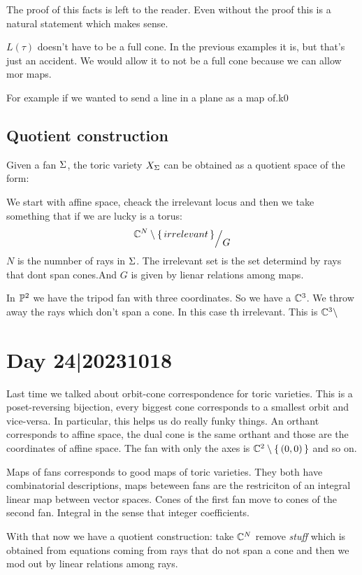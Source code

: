 \documentclass[12pt]{memoir}
\begin{document}
The proof of this facts is left to the reader. Even without the proof this is a natural statement which makes sense.
\begin{significant}
    $L(\tau)$ doesn't have to be a full cone. In the previous examples it is, but that's just an accident. We would allow it to not be a full cone because we can allow mor maps.
\end{significant}
For example if we wanted to send a line in a plane as a map of.k0

\subsection{Quotient construction}

Given a fan $\Sigma$, the toric variety $X_\Sigma$ can be obtained as a quotient space of the form:\par 
We start with affine space, cheack the irrelevant locus and then we take something that if we are lucky is a torus:
$$\quot{\bC^N\less\set{irrelevant}}{G}$$
$N$ is the numnber of rays in $\Sigma$. The irrelevant set is the set determind by rays that dont span cones.And $G$ is given by lienar relations among maps. 

\begin{Ex}
In $\mathbb{P}^2$  we have the tripod fan with three coordinates. So we have a $\mathbb{C}^3$. We throw away the rays which don't span a cone. In this case th irrelevant. This is $\mathbb{C}^3\setminus$ 
\end{Ex}

\section{Day 24|20231018}

Last time we talked about orbit-cone correspondence for toric varieties. This is a poset-reversing bijection, every biggest cone corresponds to a smallest orbit and vice-versa. In particular, this helps us do really funky things. An orthant corresponds to affine space, the dual cone is the same orthant and those are the coordinates of affine space. The fan with only the axes is $\mathbb{C}^2\setminus\{\,(0,0)\,\}$ and so on.\par 
Maps of fans corresponds to good maps of toric varieties. They both have combinatorial descriptions, maps beteween fans are the restriciton of an integral linear map between vector spaces. Cones of the first fan move to cones of the second fan. Integral in the sense that integer coefficients.\par 
With that now we have a quotient construction: take $\mathbb{C}^N$ remove \emph{stuff} which is obtained from equations coming from rays that do not span a cone and then we mod out by linear relations among rays.
\end{document}
